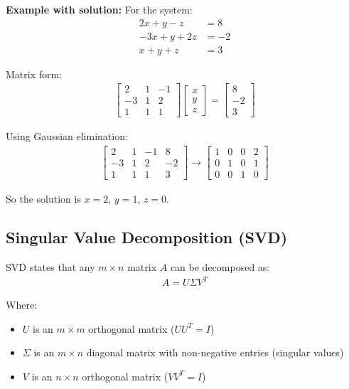 \documentclass{article}
\begin{document}
\textbf{Example with solution:}
For the system:
\begin{align}
2x + y - z &= 8\\
-3x + y + 2z &= -2\\
x + y + z &= 3
\end{align}

Matrix form:
\begin{align}
\begin{bmatrix} 
2 & 1 & -1 \\
-3 & 1 & 2 \\
1 & 1 & 1
\end{bmatrix}
\begin{bmatrix} x \\ y \\ z \end{bmatrix} = 
\begin{bmatrix} 8 \\ -2 \\ 3 \end{bmatrix}
\end{align}

Using Gaussian elimination:
\begin{align}
\left[\begin{array}{ccc|c}
2 & 1 & -1 & 8 \\
-3 & 1 & 2 & -2 \\
1 & 1 & 1 & 3
\end{array}\right] \rightarrow
\left[\begin{array}{ccc|c}
1 & 0 & 0 & 2 \\
0 & 1 & 0 & 1 \\
0 & 0 & 1 & 0
\end{array}\right]
\end{align}

So the solution is $x = 2$, $y = 1$, $z = 0$.

\subsection{Singular Value Decomposition (SVD)}

SVD states that any $m \times n$ matrix $A$ can be decomposed as:
\begin{align}
A = U\Sigma V^T
\end{align}

Where:
\begin{itemize}
    \item $U$ is an $m \times m$ orthogonal matrix ($UU^T = I$)
    \item $\Sigma$ is an $m \times n$ diagonal matrix with non-negative entries (singular values)
    \item $V$ is an $n \times n$ orthogonal matrix ($VV^T = I$)
\end{itemize}
\end{document}
